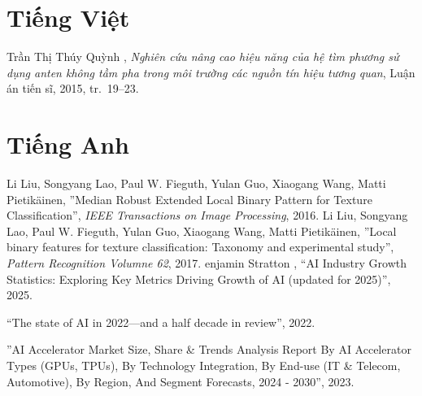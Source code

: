 \documentclass[a4paper,12pt,oneside]{book}%
\renewcommand{\baselinestretch}{1.4}
\begin{document}
\def\baselinestretch{1}
\vspace{-2cm}
\renewcommand{\bibname}{Tài liệu tham khảo}
\clearpage
{}
{}
\renewcommand{\refname}{Literary works}
\begin{thebibliography}{xx}
	\section*{Tiếng Việt}
	\vspace{0.3cm}
	Trần Thị Thúy Quỳnh , {\em {Nghi{\^{e}}n cứu
			n{\^{a}}ng cao hiệu năng của hệ t{\`{i}}m phương sử dụng anten
			kh{\^{o}}ng tầm pha trong m{\^{o}}i trường c{\'{a}}c nguồn t{\'{i}}n
			hiệu tương quan}}, Luận án tiến sĩ, 2015, tr.~19--23.
	\vspace{0.5cm}	
	\section*{Tiếng Anh}	
	
	Li Liu, Songyang Lao, Paul W. Fieguth, Yulan Guo, Xiaogang Wang, Matti Pietikäinen, ''Median Robust Extended Local Binary Pattern for Texture Classification'', {\em IEEE Transactions on Image Processing}, 2016.
	Li Liu, Songyang Lao, Paul W. Fieguth, Yulan Guo, Xiaogang Wang, Matti Pietikäinen, ''Local binary features for texture classification: Taxonomy and experimental study'', {\em Pattern Recognition Volumne 62}, 2017.
	enjamin Stratton  , ``AI Industry Growth Statistics: Exploring Key Metrics Driving Growth of AI (updated for 2025)'', 2025.
	
	``The state of AI in 2022—and a half decade in review'', 2022.
	
	''AI Accelerator Market Size, Share \& Trends Analysis Report By AI Accelerator Types (GPUs, TPUs), By Technology Integration, By End-use (IT \& Telecom, Automotive), By Region, And Segment Forecasts, 2024 - 2030'', 2023.
	

\end{thebibliography}
\end{document}
